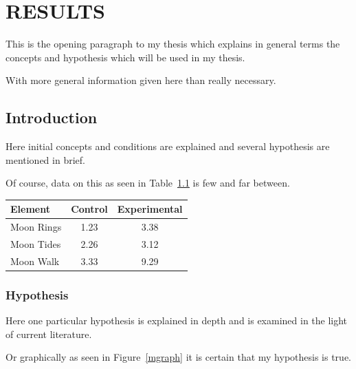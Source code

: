 \chapter{RESULTS}

This is the opening paragraph to my thesis which
explains in general terms the concepts and hypothesis
which will be used in my thesis.

With more general information given here than really
necessary.

\section{Introduction}

Here initial concepts and conditions are explained and
several hypothesis are mentioned in brief.

Of course, data on this as seen in Table~\ref{data}
is few and far between.

\begin{table}[h!tb] \centering
{}
\label{data}
\begin{tabular}{lcc} \hline
\textbf{Element} & \textbf{Control} & \textbf{Experimental} \\ \hline
Moon Rings & 1.23 & 3.38 \\
Moon Tides & 2.26 & 3.12 \\
Moon Walk & 3.33 & 9.29 \\ \hline
\end{tabular}
\end{table}


\subsection{Hypothesis}

Here one particular hypothesis is explained in depth
and is examined in the light of current literature.

Or graphically as seen in Figure~\ref{mgraph}
it is certain that my hypothesis is true.

